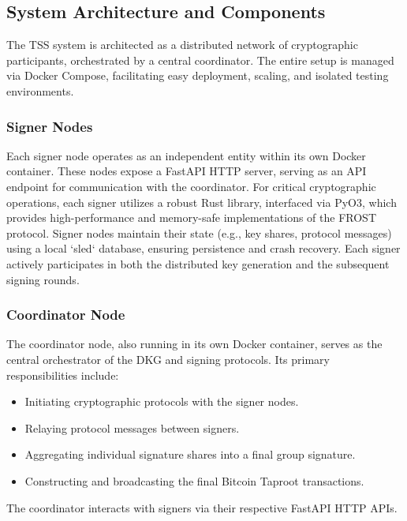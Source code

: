 \documentclass{DESSThesis}
\begin{document}
\subsection{System Architecture and Components}
The TSS system is architected as a distributed network of cryptographic participants, orchestrated by a central coordinator. The entire setup is managed via Docker Compose, facilitating easy deployment, scaling, and isolated testing environments.

\subsubsection{Signer Nodes}
Each signer node operates as an independent entity within its own Docker container. These nodes expose a FastAPI HTTP server, serving as an API endpoint for communication with the coordinator. For critical cryptographic operations, each signer utilizes a robust Rust library, interfaced via PyO3, which provides high-performance and memory-safe implementations of the FROST protocol. Signer nodes maintain their state (e.g., key shares, protocol messages) using a local `sled` database, ensuring persistence and crash recovery. Each signer actively participates in both the distributed key generation and the subsequent signing rounds.

\subsubsection{Coordinator Node}
The coordinator node, also running in its own Docker container, serves as the central orchestrator of the DKG and signing protocols. Its primary responsibilities include:
\begin{itemize}
    \item Initiating cryptographic protocols with the signer nodes.
    \item Relaying protocol messages between signers.
    \item Aggregating individual signature shares into a final group signature.
    \item Constructing and broadcasting the final Bitcoin Taproot transactions.
\end{itemize}
The coordinator interacts with signers via their respective FastAPI HTTP APIs.
\end{document}
